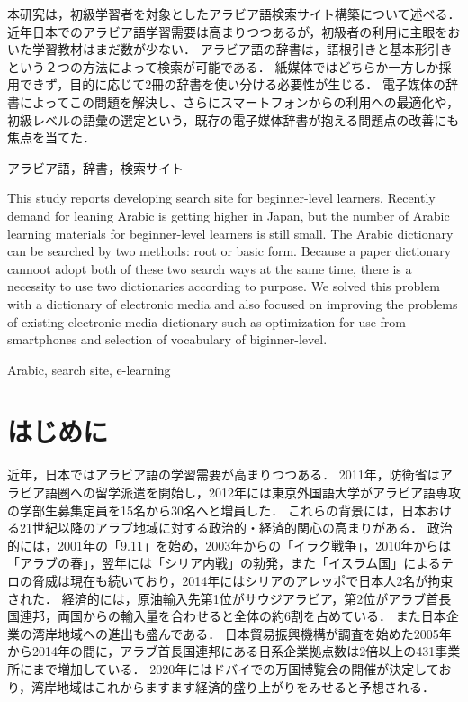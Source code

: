 \documentclass[technicalreport]{ieicej}
\begin{document}
\setarab
\begin{jabstract}
本研究は，初級学習者を対象としたアラビア語検索サイト構築について述べる．
近年日本でのアラビア語学習需要は高まりつつあるが，初級者の利用に主眼をおいた学習教材はまだ数が少ない．
アラビア語の辞書は，語根引きと基本形引きという２つの方法によって検索が可能である．
紙媒体ではどちらか一方しか採用できず，目的に応じて2冊の辞書を使い分ける必要性が生じる．
電子媒体の辞書によってこの問題を解決し、さらにスマートフォンからの利用への最適化や，初級レベルの語彙の選定という，既存の電子媒体辞書が抱える問題点の改善にも焦点を当てた．

\end{jabstract}
\begin{jkeyword}
アラビア語，辞書，検索サイト
\end{jkeyword}
\begin{eabstract}
This study reports developing search site for beginner-level learners.
Recently demand for leaning Arabic is getting higher in Japan, but the number of Arabic learning materials for beginner-level learners is still small.
The Arabic dictionary can be searched by two methods: root or basic form.
Because a paper dictionary cannoot adopt both of these two search ways at the same time, there is a necessity to use two dictionaries according to purpose.
We solved this problem with a dictionary of electronic media and also focused on improving the problems of existing electronic media dictionary such as optimization for use from smartphones and selection of vocabulary of biginner-level.

\end{eabstract}
\begin{ekeyword}
Arabic, search site, e-learning
\end{ekeyword}
\maketitle
\section{はじめに}
近年，日本ではアラビア語の学習需要が高まりつつある．
2011年，防衛省はアラビア語圏への留学派遣を開始し\cite{nikkei}，2012年には東京外国語大学がアラビア語専攻の学部生募集定員を15名から30名へと増員した．
これらの背景には，日本おける21世紀以降のアラブ地域に対する政治的・経済的関心の高まりがある．
政治的には，2001年の「9.11」を始め，2003年からの「イラク戦争」，2010年からは「アラブの春」，翌年には「シリア内戦」の勃発，また「イスラム国」によるテロの脅威は現在も続いており，2014年にはシリアのアレッポで日本人2名が拘束された．
経済的には，原油輸入先第1位がサウジアラビア，第2位がアラブ首長国連邦，両国からの輸入量を合わせると全体の約6割を占めている\cite{teikoku}．
また日本企業の湾岸地域への進出も盛んである．
日本貿易振興機構が調査を始めた2005年から2014年の間に，アラブ首長国連邦にある日系企業拠点数は2倍以上の431事業所にまで増加している\cite{jetro}．
2020年にはドバイでの万国博覧会の開催が決定しており，湾岸地域はこれからますます経済的盛り上がりをみせると予想される．
\end{document}
